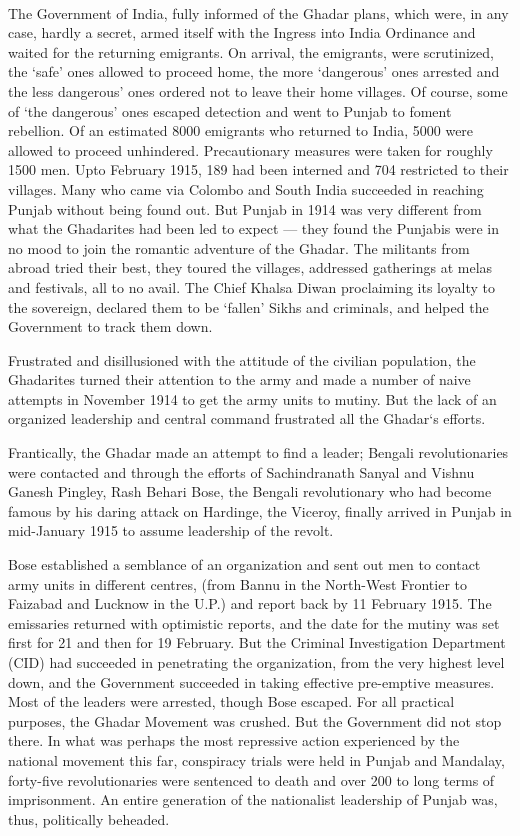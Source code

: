 \paragraph*{}


The Government of India, fully informed of the Ghadar plans, which were, in any case, hardly a secret, armed itself with the Ingress into India Ordinance and waited for the returning emigrants. On arrival, the emigrants, were scrutinized, the `safe' ones allowed to proceed home, the more `dangerous' ones arrested and the less dangerous' ones ordered not to leave their home villages. Of course, some of `the dangerous' ones escaped detection and went to Punjab to foment rebellion. Of an estimated 8000 emigrants who returned to India, 5000 were allowed to proceed unhindered. Precautionary measures were taken for roughly 1500 men. Upto February 1915, 189 had been interned and 704 restricted to their villages. Many who came via Colombo and South India succeeded in reaching Punjab without being found out. But Punjab in 1914 was very different from what the Ghadarites had been led to expect — they found the Punjabis were in no mood to join the romantic adventure of the Ghadar. The militants from abroad tried their best, they toured the villages, addressed gatherings at melas and festivals, all to no avail. The Chief Khalsa Diwan proclaiming its loyalty to the sovereign, declared them to be `fallen' Sikhs and criminals, and helped the Government to track them down.

Frustrated and disillusioned with the attitude of the civilian population, the Ghadarites turned their attention to the army and made a number of naive attempts in November 1914 to get the army units to mutiny. But the lack of an organized leadership and central command frustrated all the Ghadar`s efforts.

Frantically, the Ghadar made an attempt to find a leader; Bengali revolutionaries were contacted and through the efforts of Sachindranath Sanyal and Vishnu Ganesh Pingley, Rash Behari Bose, the Bengali revolutionary who had become famous by his daring attack on Hardinge, the Viceroy, finally arrived in Punjab in mid-January 1915 to assume leadership of the revolt.

Bose established a semblance of an organization and sent out men to contact army units in different centres, (from Bannu in the North-West Frontier to Faizabad and Lucknow in the U.P.) and report back by 11 February 1915. The emissaries returned with optimistic reports, and the date for the mutiny was set first for 21 and then for 19 February. But the Criminal Investigation Department (CID) had succeeded in penetrating the organization, from the very highest level down, and the Government succeeded in taking effective pre-emptive measures. Most of the leaders were arrested, though Bose escaped. For all practical purposes, the Ghadar Movement was crushed. But the Government did not stop there. In what was perhaps the most repressive action experienced by the national movement this far, conspiracy trials were held in Punjab and Mandalay, forty-five revolutionaries were sentenced to death and over 200 to long terms of imprisonment. An entire generation of the nationalist leadership of Punjab was, thus, politically beheaded.

